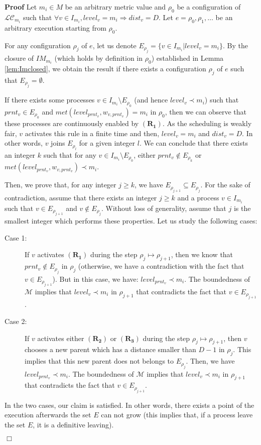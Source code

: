 \documentclass[11pt]{article}
\newenvironment{proof}{\noindent\textbf{Proof}}{\hfill\qed}
\newcommand{\qed}{\hfill$\Box$}
\begin{document}
\begin{proof}
Let $m_i\in M$ be an arbitrary metric value and $\rho_0$ be a configuration of $\mathcal{LC}_{m_i}$ such that $\forall v\in I_{m_i},level_v=m_i\Rightarrow dist_v=D$. Let $e=\rho_0,\rho_1,\ldots$ be an arbitrary execution starting from $\rho_0$.

For any configuration $\rho_j$ of $e$, let us denote $E_{\rho_j}=\{v\in I_{m_i}|level_v=m_i\}$. By the closure of $IM_{m_i}$ (which holds by definition in $\rho_0$) established in Lemma \ref{lem:Imclosed}, we obtain the result if there exists a configuration $\rho_j$ of $e$ such that $E_{\rho_j}=\emptyset$.

If there exists some processes $v\in I_{m_i}\setminus E_{\rho_0}$ (and hence $level_v\prec m_i$) such that $prnt_v\in E_{\rho_0}$ and $met(level_{prnt_v},w_{v,prnt_v})=m_i$ in $\rho_0$, then we can observe that these processes are continuously enabled by $\boldsymbol{(R_1)}$. As the scheduling is weakly fair, $v$ activates this rule in a finite time and then, $level_v=m_i$ and $dist_v=D$. In other words, $v$ joins $E_{\rho_l}$ for a given integer $l$. We can conclude that there exists an integer $k$ such that for any $v\in I_{m_i}\setminus E_{\rho_0}$, either $prnt_v\notin E_{\rho_k}$ or $met(level_{prnt_v},w_{v,prnt_v})\prec m_i$.

Then, we prove that, for any integer $j\geq k$, we have $E_{\rho_{j+1}}\subseteq E_{\rho_j}$. For the sake of contradiction, assume that there exists an integer $j\geq k$ and a process $v\in I_{m_i}$ such that $v\in E_{\rho_{j+1}}$ and $v\notin E_{\rho_j}$. Without loss of generality, assume that $j$ is the smallest integer which performs these properties. Let us study the following cases:
\begin{description}
\item[Case 1:] If $v$ activates $\boldsymbol{(R_1)}$ during the step $\rho_j\mapsto \rho_{j+1}$, then we know that $prnt_v\notin E_{\rho_j}$ in $\rho_j$ (otherwise, we have a contradiction with the fact that $v\in E_{\rho_{j+1}}$). But in this case, we have: $level_{prnt_v}\prec m_i$. The boundedness of $\mathcal{M}$ implies that $level_v\prec m_i$ in $\rho_{j+1}$ that contradicts the fact that $v\in E_{\rho_{j+1}}$.
\item[Case 2:] If $v$ activates either $\boldsymbol{(R_2)}$ or $\boldsymbol{(R_3)}$ during the step $\rho_j\mapsto \rho_{j+1}$, then $v$ chooses a new parent which has a distance smaller than $D-1$ in $\rho_j$. This implies that this new parent does not belongs to $E_{\rho_j}$. Then, we have $level_{prnt_v}\prec m_i$. The boundedness of $\mathcal{M}$ implies that $level_v\prec m_i$ in $\rho_{j+1}$ that contradicts the fact that $v\in E_{\rho_{j+1}}$.
\end{description}
In the two cases, our claim is satisfied. In other words, there exists a point of the execution afterwards the set $E$ can not grow (this implies that, if a process leave the set $E$, it is a definitive leaving).


\end{proof}
\end{document}
